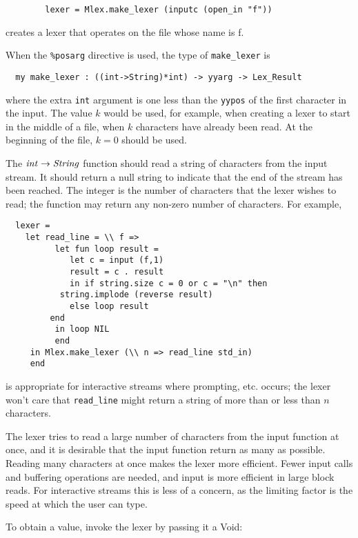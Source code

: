 \begin{verbatim}
        lexer = Mlex.make_lexer (inputc (open_in "f"))
\end{verbatim}

creates a lexer that operates on the file whose name is f.

When the {\tt \%posarg} directive is used, the type of
{\tt make_lexer} is 
\begin{verbatim}
  my make_lexer : ((int->String)*int) -> yyarg -> Lex_Result
\end{verbatim}
where the extra {\tt int} argument is one less than the {\tt yypos}
of the first character in the input.  The value $k$ would be used,
for example, when creating
a lexer to start in the middle of a file, when $k$ characters have
already been read.  At the beginning of the file, $k=0$ should be used.

The ${\it int} \rightarrow {\it String}$ function
should read a string of characters
from the input stream.  It should return a null string to indicate
that the end of the stream has been reached.  The integer is the
number of characters that the lexer wishes to read; the function may
return any non-zero number of characters.  For example, 

\begin{verbatim}
  lexer = 
    let read_line = \\ f =>
          let fun loop result =
             let c = input (f,1)
	         result = c . result
             in if string.size c = 0 or c = "\n" then
	  	   string.implode (reverse result)
	         else loop result
	     end
          in loop NIL
          end
     in Mlex.make_lexer (\\ n => read_line std_in)
     end
\end{verbatim}

is appropriate for interactive streams where prompting, etc.  occurs;
the lexer won't care that \verb|read_line| might return a string of more
than or less than $n$ characters.

The lexer tries to read a large number of characters from the input
function at once, and it is desirable that the input function return
as many as possible.  Reading many characters at once makes the lexer
more efficient.  Fewer input calls and buffering operations are
needed, and input is more efficient in large block reads.  For
interactive streams this is less of a concern, as the limiting factor
is the speed at which the user can type.

To obtain a value, invoke the lexer by passing it a Void:

